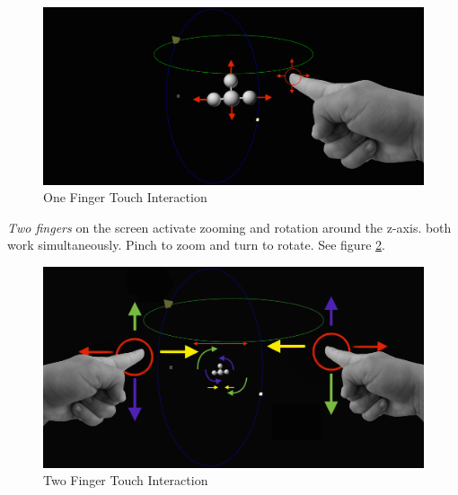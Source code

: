 \documentclass[12pt]{extarticle}
\begin{document}
\begin{appendices}
\begin{center}
\begin{figure}[!h]
\includegraphics[scale=0.4]{Images/Touch1Finger.png}
\caption{One Finger Touch Interaction}
\label{fig: AT1F}
\end{figure}
\end{center}

\emph{Two fingers} on the screen activate zooming and rotation around the z-axis. both work simultaneously. Pinch to zoom and turn to rotate.
See figure \ref{fig: AT2F}.
\begin{center}
\begin{figure}[!ht]
\includegraphics[scale=0.4]{Images/Touch2Fingers.png}
\caption{Two Finger Touch Interaction}
\label{fig: AT2F}
\end{figure}
\end{center}


\end{appendices}
\end{document}
